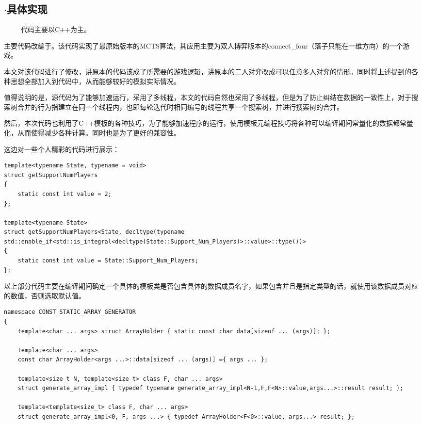 \documentclass[9pt,twocolumn,twoside]{osajnl}
\begin{document}
\subsection{$\cdot$具体实现}
\begin{adjustwidth}{2em}{}	
	\ \ \ \ \
	代码主要以C++为主。
	
	主要代码改编于\cite{MCTSbasecode}。该代码实现了最原始版本的MCTS算法，其应用主要为双人博弈版本的connect\_four（落子只能在一维方向）的一个游戏。
	
	本文对该代码进行了修改，讲原本的代码该成了所需要的游戏逻辑，讲原本的二人对弈改成可以任意多人对弈的情形。同时将上述提到的各种思想全部加入到代码中，从而能够较好的模拟实际情况。
	
	值得说明的是，源代码为了能够加速运行，采用了多线程，本文的代码自然也采用了多线程，但是为了防止纠结在数据的一致性上，对于搜索树合并的行为指建立在同一个线程内，也即每轮迭代时相同编号的线程共享一个搜索树，并进行搜索树的合并。
	
	然后，本次代码也利用了C++模板的各种技巧，为了能够加速程序的运行，使用模板元编程技巧将各种可以编译期间常量化的数据都常量化，从而使得减少各种计算。同时也是为了更好的兼容性。
	
	这边对一些个人精彩的代码进行展示：

	 
\begin{lstlisting}
template<typename State, typename = void>
struct getSupportNumPlayers
{
	static const int value = 2;
};
	   
template<typename State>
struct getSupportNumPlayers<State, decltype(typename std::enable_if<std::is_integral<decltype(State::Support_Num_Players)>::value>::type())>
{
	static const int value = State::Support_Num_Players;
};
\end{lstlisting}
以上部分代码主要在编译期间确定一个具体的模板类是否包含具体的数据成员名字，如果包含并且是指定类型的话，就使用该数据成员对应的数值，否则选取默认值。

\begin{lstlisting}
namespace CONST_STATIC_ARRAY_GENERATOR
{
	template<char ... args> struct ArrayHolder { static const char data[sizeof ... (args)]; };

	template<char ... args>
	const char ArrayHolder<args ...>::data[sizeof ... (args)] ={ args ... };

	template<size_t N, template<size_t> class F, char ... args>
	struct generate_array_impl { typedef typename generate_array_impl<N-1,F,F<N>::value,args...>::result result; };

	template<template<size_t> class F, char ... args>
	struct generate_array_impl<0, F, args ...> { typedef ArrayHolder<F<0>::value, args...> result; };


\end{lstlisting}
\end{adjustwidth}
\end{document}
